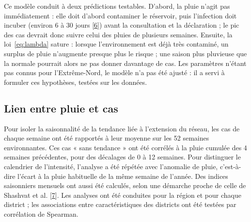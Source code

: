 \documentclass[11pt]{article}
\begin{document}

Ce modèle conduit à deux prédictions testables. D'abord, la pluie n'agit pas immédiatement : elle doit d'abord contaminer le réservoir, puis l'infection doit incuber (environ 6 à 30 jours [\hyperlink{ref6}{6}]) avant la consultation et la déclaration ; le pic des cas devrait donc suivre celui des pluies de plusieurs semaines. Ensuite, la loi~\eqref{eq:lambda} sature : lorsque l'environnement est déjà très contaminé, un surplus de pluie n'augmente presque plus le risque ; une saison plus pluvieuse que la normale pourrait alors ne pas donner davantage de cas. Les paramètres n'étant pas connus pour l'Extrême-Nord, le modèle n'a pas été ajusté : il a servi à formuler ces hypothèses, testées sur les données.

\subsection{Lien entre pluie et cas}
Pour isoler la saisonnalité de la tendance liée à l'extension du réseau, les cas de chaque semaine ont été rapportés à leur moyenne sur les 52 semaines environnantes. Ces cas « sans tendance » ont été corrélés à la pluie cumulée des 4 semaines précédentes, pour des décalages de 0 à 12 semaines. Pour distinguer le calendrier de l'intensité, l'analyse a été répétée avec l'anomalie de pluie, c'est-à-dire l'écart à la pluie habituelle de la même semaine de l'année. Des indices saisonniers mensuels ont aussi été calculés, selon une démarche proche de celle de Shashvat et al. [\hyperlink{ref7}{7}]. Les analyses ont été conduites pour la région et pour chaque district ; les associations entre caractéristiques des districts ont été testées par corrélation de Spearman.
\end{document}
